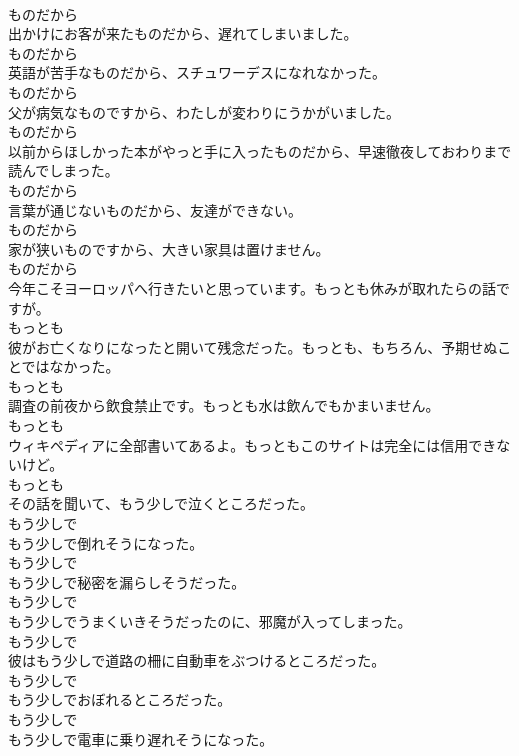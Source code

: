 \documentclass[8pt]{extreport}
\begin{document}
\begin{CJK}{UTF8}{min}
\\	ものだから
\\	出かけにお客が来たものだから、遅れてしまいました。	
\\	ものだから
\\	英語が苦手なものだから、スチュワーデスになれなかった。	
\\	ものだから
\\	父が病気なものですから、わたしが変わりにうかがいました。	
\\	ものだから
\\	以前からほしかった本がやっと手に入ったものだから、早速徹夜しておわりまで読んでしまった。	
\\	ものだから
\\	言葉が通じないものだから、友達ができない。	
\\	ものだから
\\	家が狭いものですから、大きい家具は置けません。	
\\	ものだから
\\	今年こそヨーロッパへ行きたいと思っています。もっとも休みが取れたらの話ですが。	
\\	もっとも
\\	彼がお亡くなりになったと開いて残念だった。もっとも、もちろん、予期せぬことではなかった。	
\\	もっとも
\\	調査の前夜から飲食禁止です。もっとも水は飲んでもかまいません。	
\\	もっとも
\\	ウィキペディアに全部書いてあるよ。もっともこのサイトは完全には信用できないけど。	
\\	もっとも
\\	その話を聞いて、もう少しで泣くところだった。	
\\	もう少しで
\\	もう少しで倒れそうになった。	
\\	もう少しで
\\	もう少しで秘密を漏らしそうだった。	
\\	もう少しで
\\	もう少しでうまくいきそうだったのに、邪魔が入ってしまった。	
\\	もう少しで
\\	彼はもう少しで道路の柵に自動車をぶつけるところだった。	
\\	もう少しで
\\	もう少しでおぼれるところだった。	
\\	もう少しで
\\	もう少しで電車に乗り遅れそうになった。	

\end{CJK}
\end{document}
